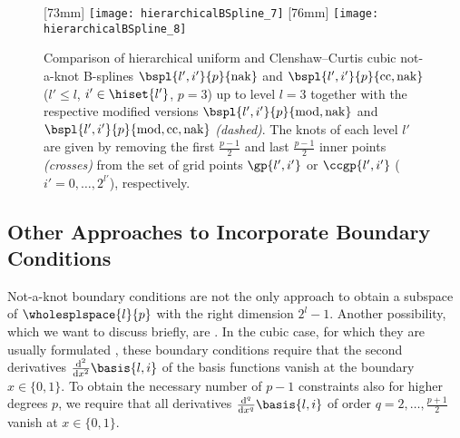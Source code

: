 \begin{figure}
  [73mm]{%
    \texttt{[image: hierarchicalBSpline\_7]}%
  }%
  \hfill
  [76mm]{%
    \texttt{[image: hierarchicalBSpline\_8]}%
  }%
  \caption[%
    Comparison of hierarchical uniform not-a-knot and
    Clenshaw--Curtis not-a-knot B-splines%
  ]{%
    Comparison of hierarchical uniform and Clenshaw--Curtis cubic not-a-knot
    B-splines $\bspl{l',i'}{p}{\nak}$ and
    $\bspl{l',i'}{p}{\cc,\nak}$
    ($l ' \le l$, $i' \in \hiset{l'}$, $p = 3$) up to level $l = 3$
    together with the respective modified versions
    $\bspl{l',i'}{p}{\modified,\nak}$ and
    $\bspl{l',i'}{p}{\modified,\cc,\nak}$
    \emph{(dashed)}.
    The knots of each level $l'$ are given by removing the
    first $\tfrac{p-1}{2}$ and last $\tfrac{p-1}{2}$
    inner points \emph{(crosses)}
    from the set of grid points $\gp{l',i'}$ or
    $\ccgp{l',i'}$
    ($i' = 0, \dotsc, 2^{l'}$), respectively.%
  }%
  \label{fig:uniformAndClenshawCurtisNotAKnotBSpline}%
\end{figure}



\subsection{Other Approaches to Incorporate Boundary Conditions}
\label{sec:324naturalBoundary}

Not-a-knot boundary conditions are not the only approach
to obtain a subspace of $\wholesplspace{l}{p}$ with the right dimension $2^l - 1$.
Another possibility, which we want to discuss briefly, are
.
In the cubic case, for which they are usually formulated
\cite{Hoellig13Approximation},
these boundary conditions require that the
second derivatives $\frac{\diff^2}{\dx^2} \basis{l,i}$ of the
basis functions vanish at the boundary $x \in \{0, 1\}$.
To obtain the necessary number of $p - 1$ constraints also
for higher degrees $p$,
we require that all derivatives
$\frac{\diff^q}{\dx^q} \basis{l,i}$ of order
$q = 2, \dotsc, \tfrac{p+1}{2}$ vanish at $x \in \{0, 1\}$.

